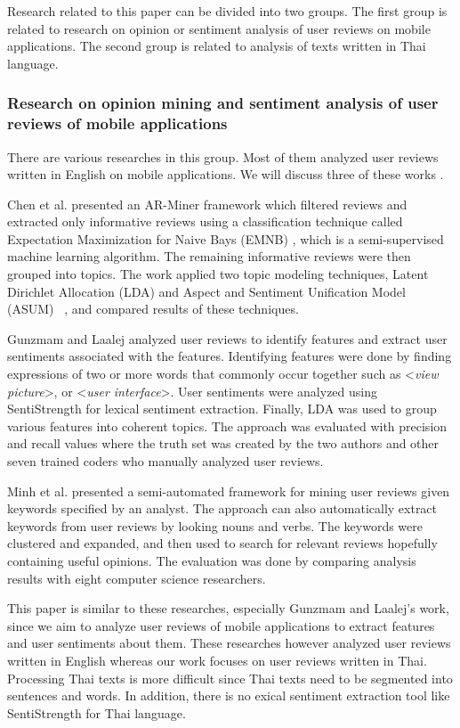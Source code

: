 Research related to this paper can be divided into two groups. The first group is related to research on opinion or sentiment analysis of user reviews on mobile applications. The second group is related to analysis of texts written in Thai language.

\subsubsection{Research on opinion mining and sentiment analysis of user reviews of mobile applications} There are various researches in this group. Most of them analyzed user reviews written in English on mobile applications. We will discuss three of these works \cite{ar-miner,userslikefeature,keywordmining}. 

Chen et al.\cite{ar-miner} presented an AR-Miner framework which filtered reviews and extracted only informative reviews using a classification technique called Expectation Maximization for Naive Bays (EMNB) \cite{EMNB}, which is a semi-supervised machine learning algorithm. The remaining informative reviews were then grouped into topics. The work applied two topic modeling techniques, Latent Dirichlet Allocation (LDA) \cite{LDA} and Aspect and Sentiment Unification Model (ASUM) ~\cite{asum}, and compared results of these techniques.

Gunzmam and Laalej \cite{userslikefeature} analyzed user reviews to identify features and extract user sentiments associated with the features. Identifying features were done by finding expressions of two or more words that commonly occur together such as <\textit{view picture}>, or <\textit{user interface}>. User sentiments were analyzed using SentiStrength \cite{SentiStrength} for lexical sentiment extraction. Finally, LDA was used to group various features into coherent topics. The approach was evaluated with precision and recall values where the truth set was created by the two authors and other seven trained coders who manually analyzed user reviews. 

Minh et al. \cite{keywordmining} presented a semi-automated framework for mining user reviews given keywords specified by an analyst. The approach can also automatically extract keywords from user reviews by looking nouns and verbs. The keywords were clustered and expanded, and then used to search for relevant reviews hopefully containing useful opinions. The evaluation was done by comparing analysis results with eight computer science researchers.

This paper is similar to these researches, especially Gunzmam and Laalej's work, since we aim to analyze user reviews of mobile applications to extract features and user sentiments about them. These researches however analyzed user reviews written in English whereas our work focuses on user reviews written in Thai. Processing Thai texts is more difficult since Thai texts need to be segmented into sentences and words. In addition, there is no exical sentiment extraction tool like SentiStrength for Thai language. 

